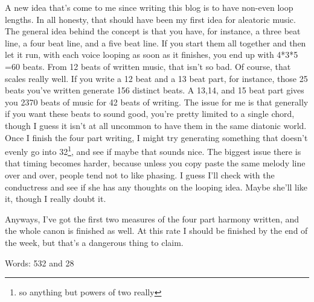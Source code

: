 \documentclass[12pt]{article}[titlepage]
\newcommand{\1}{\={a}}
\newcommand{\2}{\={e}}
\newcommand{\3}{\={\i}}
\newcommand{\4}{\=o}
\newcommand{\5}{\=u}
\newcommand{\6}{\={A}}
\renewcommand{\,}{\textsuperscript{,}}
\begin{document}
A new idea that's come to me since writing this blog is to have non-even loop lengths.
In all honesty, that should have been my first idea for aleatoric music.
The general idea behind the concept is that you have, for instance, a three beat line, a four beat line, and a five beat line.
If you start them all together and then let it run, with each voice looping as soon as it finishes, you end up with 4*3*5 =60 beats.
From 12 beats of written music, that isn't so bad.
Of course, that scales really well.
If you write a 12 beat and a 13 beat part, for instance, those 25 beats you've written generate 156 distinct beats.
A 13,14, and 15 beat part gives you 2370 beats of music for 42 beats of writing.
The issue for me is that generally if you want these beats to sound good, you're pretty limited to a single chord, though I guess it isn't at all uncommon to have them in the same diatonic world.
Once I finish the four part writing, I might try generating something that doesn't evenly go into 32\footnote{so anything but powers of two really}, and see if maybe that sounds nice.
The biggest issue there is that timing becomes harder, because unless you copy paste the same melody line over and over, people tend not to like phasing.
I guess I'll check with the conductress and see if she has any thoughts on the looping idea.
Maybe she'll like it, though I really doubt it.

Anyways, I've got the first two measures of the four part harmony written, and the whole canon is finished as well.
At this rate I should be finished by the end of the week, but that's a dangerous thing to claim.

Words:
532 and 28
\end{document}
